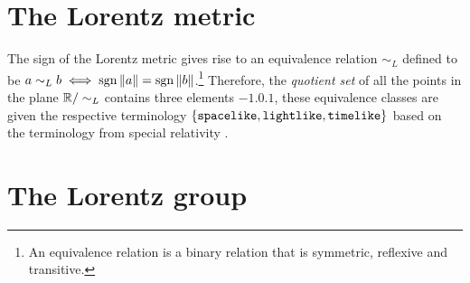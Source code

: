 \section{The Lorentz metric}
The sign of the Lorentz metric gives rise to an equivalence relation $\sim_L$ defined to be $a \sim_L b \iff \operatorname{sgn}{\norm{a}} = \operatorname{sgn}{\norm{b}}$.\footnote{An equivalence relation is a binary relation that is symmetric, reflexive and transitive.} Therefore, the \emph{quotient set} of all the points in the plane $\mathbb{R} / \sim_L $ contains three elements $\qty{-1, 0, 1}$, these equivalence classes are given the respective terminology $\qty{\text{\texttt{spacelike}}, \text{\texttt{lightlike}}, \text{\texttt{timelike}}}$ based on the terminology from special relativity \cite{Landau1971}.
 



\section{The Lorentz group}

